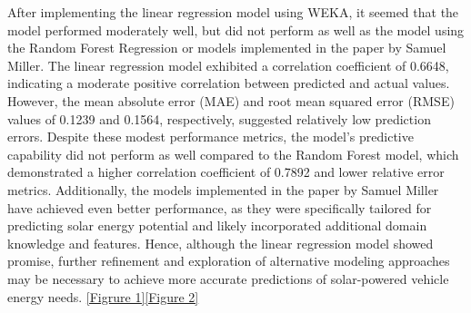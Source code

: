 \documentclass[10pt,twocolumn]{article}
\begin{document}
After implementing the linear regression model using WEKA, it seemed that the model performed moderately well, but did not perform as well as the model using the Random Forest Regression or models implemented in the paper by Samuel Miller. The linear regression model exhibited a correlation coefficient of 0.6648, indicating a moderate positive correlation between predicted and actual values. However, the mean absolute error (MAE) and root mean squared error (RMSE) values of 0.1239 and 0.1564, respectively, suggested relatively low prediction errors. Despite these modest performance metrics, the model's predictive capability did not perform as well compared to the Random Forest model, which demonstrated a higher correlation coefficient of 0.7892 and lower relative error metrics. Additionally, the models implemented in the paper by Samuel Miller have achieved even better performance, as they were specifically tailored for predicting solar energy potential and likely incorporated additional domain knowledge and features. Hence, although the linear regression model showed promise, further refinement and exploration of alternative modeling approaches may be necessary to achieve more accurate predictions of solar-powered vehicle energy needs. \ref{Figrure 1}\ref{Figure 2}
\end{document}
